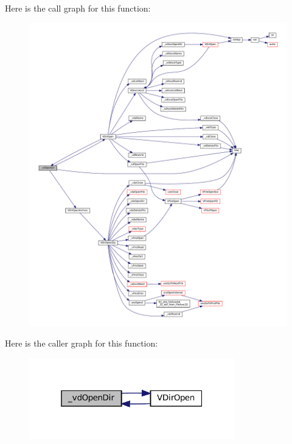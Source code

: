 Here is the call graph for this function\+:
\nopagebreak
\begin{figure}[H]
\begin{center}
\leavevmode
\includegraphics[width=350pt]{vfs-dirent_8c_a9d6bc6a6c2255b69ab39ee64c4da8456_cgraph}
\end{center}
\end{figure}
Here is the caller graph for this function\+:
\nopagebreak
\begin{figure}[H]
\begin{center}
\leavevmode
\includegraphics[width=253pt]{vfs-dirent_8c_a9d6bc6a6c2255b69ab39ee64c4da8456_icgraph}
\end{center}
\end{figure}
\mbox{\label{vfs-dirent_8c_af98a3b7223717a0c978ed248a6f0310b}} 
